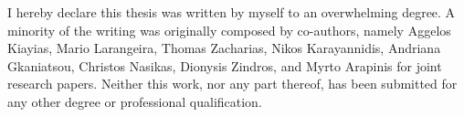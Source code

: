 \begin{declaration}
    I hereby declare this thesis was written by myself to an overwhelming
    degree. A minority of the writing was originally composed by co-authors,
    namely Aggelos Kiayias, Mario Larangeira, Thomas Zacharias, Nikos
    Karayannidis, Andriana Gkaniatsou, Christos Nasikas, Dionysis Zindros, and
    Myrto Arapinis for joint research papers. Neither this work, nor any part
    thereof, has been submitted for any other degree or professional
    qualification.
    \par
    \vspace{0.5in}
\end{declaration}
